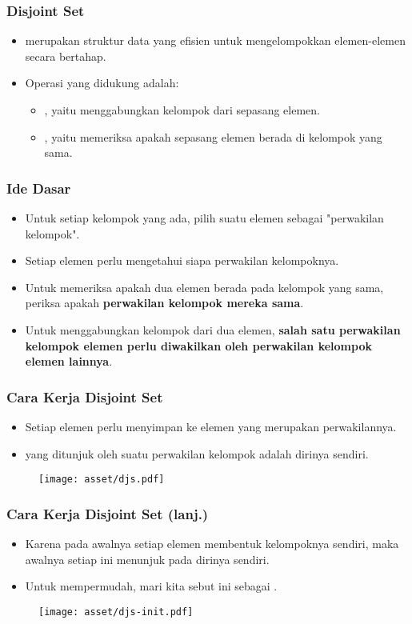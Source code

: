 \begin{frame}
\frametitle{Disjoint Set}
\begin{itemize}
  \item \pDjs merupakan struktur data yang efisien untuk mengelompokkan elemen-elemen secara bertahap.
  \item Operasi yang didukung adalah:
  \begin{itemize}
    \item {}, yaitu menggabungkan kelompok dari sepasang elemen.
    \item {}, yaitu memeriksa apakah sepasang elemen berada di kelompok yang sama.
  \end{itemize}
\end{itemize}
\end{frame}

\begin{frame}
\frametitle{Ide Dasar}
\begin{itemize}
  \item Untuk setiap kelompok yang ada, pilih suatu elemen sebagai "perwakilan kelompok".
  \item Setiap elemen perlu mengetahui siapa perwakilan kelompoknya.
  \item Untuk memeriksa apakah dua elemen berada pada kelompok yang sama, periksa apakah \textbf{perwakilan kelompok mereka sama}.
  \item Untuk menggabungkan kelompok dari dua elemen, \textbf{salah satu perwakilan kelompok elemen perlu diwakilkan oleh perwakilan kelompok elemen lainnya}.
\end{itemize}
\end{frame}

\begin{frame}
\frametitle{Cara Kerja Disjoint Set}
\begin{itemize}
  \item Setiap elemen perlu menyimpan  ke elemen yang merupakan perwakilannya.
  \item {} yang ditunjuk oleh suatu perwakilan kelompok adalah dirinya sendiri.
\end{itemize}
\begin{figure}
  \texttt{[image: asset/djs.pdf]}
\end{figure}
\end{frame}

\begin{frame}
\frametitle{Cara Kerja Disjoint Set (lanj.)}
\begin{itemize}
  \item Karena pada awalnya setiap elemen membentuk kelompoknya sendiri, maka awalnya setiap  ini menunjuk pada dirinya sendiri.
  \item Untuk mempermudah, mari kita sebut  ini sebagai .
\end{itemize}
\begin{figure}
  \texttt{[image: asset/djs-init.pdf]}
\end{figure}
\end{frame}

